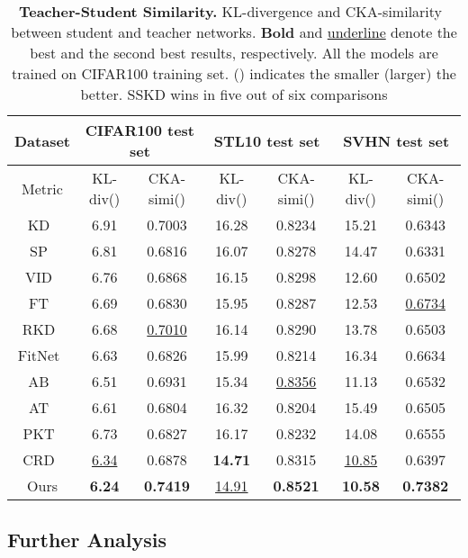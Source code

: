 \documentclass[runningheads]{llncs}
\begin{document}
\begin{table}[t]
	\centering
	\small
	\caption{\textbf{Teacher-Student Similarity.} KL-divergence and CKA-similarity~\cite{cka} between student and teacher networks. \textbf{Bold} and \underline{underline} denote the best and the second best results, respectively. All the models are trained on CIFAR100 training set.  () indicates the smaller (larger) the better. SSKD wins in five out of six comparisons}
	\vspace{-5pt}
	\begin{tabular}{c|cc|cc|cc}
		\hline
		Dataset & \multicolumn{2}{c|}{CIFAR100 test set} & \multicolumn{2}{c|}{STL10 test set} & \multicolumn{2}{c}{SVHN test set}\\
        \hline
		Metric & KL-div() & CKA-simi() & KL-div() & CKA-simi() & KL-div() & CKA-simi() \\
		\hline
		KD~\cite{KD}  & 6.91 & 0.7003 & 16.28 & 0.8234 & 15.21 & 0.6343\\
		SP~\cite{simi}  & 6.81 & 0.6816 & 16.07 & 0.8278 & 14.47 & 0.6331\\
		VID~\cite{vid}  & 6.76 & 0.6868 & 16.15 & 0.8298 & 12.60 & 0.6502\\
		FT~\cite{FT}  & 6.69 & 0.6830 & 15.95 & 0.8287 & 12.53 & \underline{0.6734}\\
		RKD~\cite{rkd}  & 6.68 & \underline{0.7010} & 16.14 & 0.8290 & 13.78 & 0.6503\\
		FitNet~\cite{fitnets}  & 6.63 & 0.6826 & 15.99 & 0.8214 & 16.34 & 0.6634\\
		AB~\cite{AB}  & 6.51 & 0.6931 & 15.34 & \underline{0.8356} & 11.13 & 0.6532\\
		AT~\cite{AT}  & 6.61 & 0.6804 & 16.32 & 0.8204 & 15.49 & 0.6505\\ 
		PKT~\cite{pkt}  & 6.73 & 0.6827 & 16.17 & 0.8232 & 14.08 & 0.6555\\
		CRD~\cite{crd}  & \underline{6.34} & 0.6878 & \textbf{14.71} & 0.8315 & \underline{10.85} & 0.6397\\
		\hline
		Ours  & \textbf{6.24} & \textbf{0.7419} & \underline{14.91} & \textbf{0.8521} & \textbf{10.58} & \textbf{0.7382}\\
		\hline 
	\end{tabular}
	\label{tb5}
\end{table}



\subsection{Further Analysis}
\label{sec:analysis}
\end{document}
